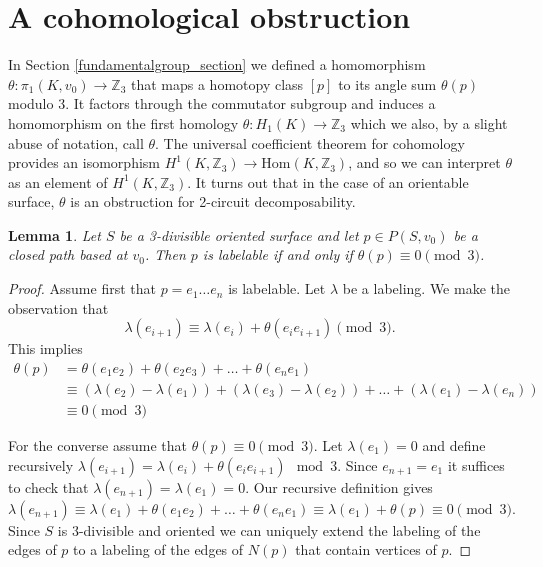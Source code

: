 \documentclass[12pt]{article}
\newtheorem{lemma}{Lemma}
\theoremstyle{definition}
\begin{document}
\section{A cohomological obstruction}

In Section \ref{fundamentalgroup_section} we defined a homomorphism $\theta\colon \pi_1(K,v_0)\to \mathbb Z_3$ that maps a homotopy class $[p]$ to its angle sum $\theta(p)$ modulo 3. It factors through the commutator subgroup and induces a homomorphism on the first homology $\theta\colon H_1(K)\to \mathbb Z_3$ which we also, by a slight abuse of notation, call $\theta$. The universal coefficient theorem for cohomology provides an isomorphism $H^1(K,\mathbb Z_3)\to \text{Hom}(K,\mathbb Z_3)$, and so we can interpret $\theta$ as an element of $H^1(K,\mathbb Z_3)$. It turns out that in the case of an orientable surface, $\theta$ is an obstruction for 2-circuit decomposability.


\begin{lemma}\label{j_cohompathobstruction_lemma}
    Let $S$ be a 3-divisible oriented surface and let $p\in P(S,v_0)$ be a closed path based at $v_0$. Then $p$ is labelable if and only if $\theta(p)\equiv0\pmod3$.
\end{lemma}

\begin{proof}
    Assume first that $p=e_1\ldots e_n$ is labelable. Let $\lambda$ be a labeling. We make the observation that $$\lambda(e_{i+1})\equiv\lambda(e_{i})+\theta(e_ie_{i+1})\pmod3.$$
    This implies
    \begin{align*}
        \theta(p) &= \theta(e_1e_2)+\theta(e_2e_3)+\ldots +\theta(e_ne_1) \\
        &\equiv (\lambda(e_2)-\lambda(e_1))+(\lambda(e_3)-\lambda(e_2))+\ldots +(\lambda(e_1)-\lambda(e_n)) \\
        &\equiv0\pmod3
    \end{align*}
    
    For the converse assume that $\theta(p)\equiv0\pmod3$. Let $\lambda(e_1)=0$ and define recursively $\lambda(e_{i+1})=\lambda(e_{i})+\theta(e_ie_{i+1})\mod3$. Since $e_{n+1}=e_1$ it suffices to check that $\lambda(e_{n+1})=\lambda(e_1)=0$. Our recursive definition gives
    $$\lambda(e_{n+1})\equiv\lambda(e_1)+\theta(e_1e_2)+\ldots +\theta(e_ne_1)\equiv\lambda(e_1)+\theta(p)\equiv0\pmod3.$$
    Since $S$ is 3-divisible and oriented we can uniquely extend the labeling of the edges of $p$ to a labeling of the edges of $N(p)$ that contain vertices of $p$.
\end{proof}
\end{document}
